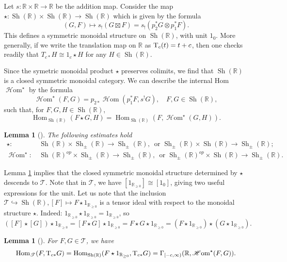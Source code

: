 \documentclass[11pt]{amsart}
\numberwithin{equation}{section}
\theoremstyle{plain}
\newtheorem{Lemma}[lemma]{Lemma}
\theoremstyle{definition}
\theoremstyle{remark}
\newcommand{\bR} { {\mathbb{R}}}
\newcommand{\sT} { {\mathscr{T}}}
\newcommand{\Sh} { {\operatorname{Sh}}}
\newcommand\Hom{\operatorname{Hom}}
\newcommand\sHom{\operatorname{\mathscr{H}om}}
\newcommand\nT{ {\textnormal{T}} }
\begin{document}
Let $s: \bR \times \bR \rightarrow \bR$ be the addition map.
Consider the map 
$\star: \Sh(\bR) \times \Sh(\bR) \rightarrow \Sh(\bR)$  which is given by the formula
\[ (G, F) \mapsto s_! (G \boxtimes F) = s_! (p_2^* G \otimes p_1^* F ).\]
This defines a symmetric monoidal structure on $\Sh(\bR)$, with unit $1_{0}$.  More generally, if we write the 
translation map on $\bR$ as $\nT_c(t)=t+c$, then 
one checks readily that $T_{c*} H \cong 1_{c} \star H$ for any $H \in \Sh(\bR)$. 

Since the symetric monoidal product $\star$ preserves colimits, we find that $\Sh(\bR)$ is a closed symmetric monoidal category. We can describe the internal Hom $\sHom^\star$ by the formula
\[\sHom^\star(F,G)=p_{2*}\sHom(p_1^{*}F,s^!G),\quad F,G\in \Sh(\bR),\]
such that, for $F,G,H\in \Sh(\bR)$, 
\[\Hom_{\Sh(\bR)}(F\star G,H)=\Hom_{\Sh(\bR)}(F,\sHom^\star(G,H)).\]


\begin{Lemma}[{\cite[Corollary 4.14]{GS2014}}] \label{lem: convolution estimates}
The following estimates hold
\begin{align*}
    \star : &\,\Sh(\bR)\times \Sh_{\pm }(\bR) \rightarrow \Sh_{\pm }(\bR),\, \text{ or } \Sh_{\pm }(\bR)\times \Sh(\bR) \rightarrow \Sh_{\pm }(\bR);\\
   \sHom^\star : &\,\Sh(\bR)^{op}\times \Sh_{\pm }(\bR) \rightarrow \Sh_{\pm }(\bR),\, \text{ or } \Sh_{\pm }(\bR)^{op}\times \Sh(\bR) \rightarrow \Sh_{\pm }(\bR).
\end{align*}
\end{Lemma}




Lemma \ref{lem: convolution estimates} implies that
the closed symmetric monoidal structure determined by $\star$
descends to $\sT$.  Note that in $\sT$, we have 
$[1_{\bR_{\geq 0}}]\cong [1_{0}]$, giving two useful expressions for
the unit.  
Let us note that the inclusion $\sT \hookrightarrow \Sh(\bR), [F] \mapsto F \star 1_{\bR_{\geq 0}}$ is a tensor ideal with respect to the monoidal structure $\star$.  Indeed: $ 1_{\bR_{\geq 0}}\star1_{\bR_{\geq 0}}=1_{\bR_{\geq 0}}$, so
\[([F]\star [G])\star 1_{\bR_{\geq 0}}=[F\star G] \star 1_{\bR_{\geq 0}}= F\star G \star 1_{\bR_{\geq 0}}=(F \star 1_{\bR_{\geq 0}}) \star (G\star 1_{\bR_{\geq 0}}).\]
\begin{Lemma}[{\cite[Lemma 4.4]{Hochschild-Kuo-Shende-Zhang}}]\label{lemma: hom computation}For $F,G\in \sT$, we have
\[\Hom_{\sT}(F,\nT_{c*}G)=\Hom_{\Sh(\bR)}(F\star 1_{\bR_{\geq 0}},\nT_{c*}G)=\Gamma_{[-c,\infty)}(\bR,\sHom^{\star}(F,G)).\]
\end{Lemma}
 
\end{document}
